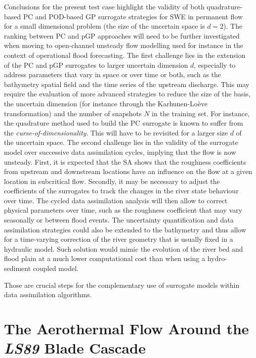 Conclusions for the present test case highlight the validity of both quadrature-based PC and POD-based GP surrogate strategies for SWE in permanent flow for a small dimensional problem (the size of the uncertain space is $d = 2$). The ranking between PC and pGP approaches will need to be further investigated when moving to open-channel unsteady flow modelling used for instance in the context of operational flood forecasting. The first challenge lies in the extension of the PC and pGP surrogates to larger uncertain dimension $d$, especially to address parameters that vary in space or over time or both, such as the bathymetry spatial field and the time series of the upstream discharge. This may require the evaluation of more advanced strategies to reduce the size of the basis, the uncertain dimension (for instance through the Karhunen-Loève transformation) and the number of snapshots $N$ in the training set. For instance, the quadrature method used to build the PC surrogate is known to suffer from the \emph{curse-of-dimensionality}. This will have to be revisited for a larger size $d$ of the uncertain space. The second challenge lies in the validity of the surrogate model over successive data assimilation cycles, implying that the flow is now unsteady. First, it is expected that the SA shows that the roughness coefficients from upstream and downstream locations have an influence on the flow at a given location in subcritical flow. Secondly, it may be necessary to adjust the coefficients of the surrogates to track the changes in the river state behaviour over time. The cycled data assimilation analysis will then allow to correct physical parameters over time, such as the roughness coefficient that may vary seasonally or between flood events. The uncertainty quantification and data assimilation strategies could also be extended to the bathymetry and thus allow for a time-varying correction of the river geometry that is usually fixed in a hydraulic model. Such solution would mimic the evolution of the river bed and flood plain at a much lower computational cost than when using a hydro-sediment coupled model.

Those are crucial steps for the complementary use of surrogate models within data assimilation algorithms.


\chapter{The Aerothermal Flow Around the \textit{LS89} Blade Cascade}\label{chap:ls89}

